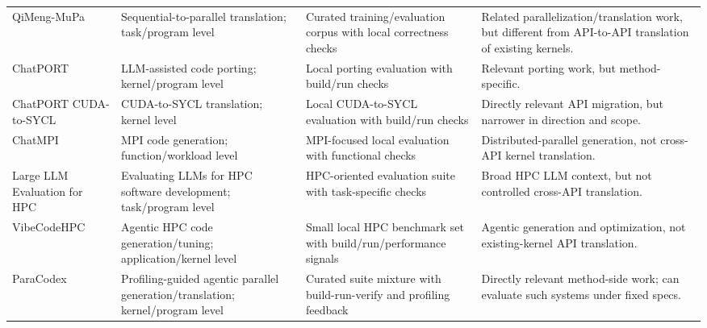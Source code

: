 \begin{table}[p]
\begin{tabularx}{\textwidth}{@{}
>{\RaggedRight\arraybackslash}p{}
>{\RaggedRight\arraybackslash}p{}
>{\RaggedRight\arraybackslash}p{}
>{\RaggedRight\arraybackslash}X
@{}}
QiMeng-MuPa~\cite{QiMengMuPa2025}
& Sequential-to-parallel translation; task/program level
& Curated training/evaluation corpus with local correctness checks
& Related parallelization/translation work, but different from API-to-API translation of existing kernels. \\

ChatPORT~\cite{ChatPORT2025}
& LLM-assisted code porting; kernel/program level
& Local porting evaluation with build/run checks
& Relevant porting work, but method-specific. \\

ChatPORT CUDA-to-SYCL~\cite{ChatPORTSYCL2025}
& CUDA-to-SYCL translation; kernel level
& Local CUDA-to-SYCL evaluation with build/run checks
& Directly relevant API migration, but narrower in direction and scope. \\

ChatMPI~\cite{ChatMPI2026}
& MPI code generation; function/workload level
& MPI-focused local evaluation with functional checks
& Distributed-parallel generation, not cross-API kernel translation. \\

Large LLM Evaluation for HPC~\cite{LargeLLMEvalHPC2024}
& Evaluating LLMs for HPC software development; task/program level
& HPC-oriented evaluation suite with task-specific checks
& Broad HPC LLM context, but not controlled cross-API translation. \\

VibeCodeHPC~\cite{VibeCodeHPC2025}
& Agentic HPC code generation/tuning; application/kernel level
& Small local HPC benchmark set with build/run/performance signals
& Agentic generation and optimization, not existing-kernel API translation. \\

ParaCodex~\cite{ParaCodex2026}
& Profiling-guided agentic parallel generation/translation; kernel/program level
& Curated suite mixture with build-run-verify and profiling feedback
& Directly relevant method-side work; \parbench{} can evaluate such systems under fixed specs. \\

\bottomrule
\end{tabularx}
\end{table}

